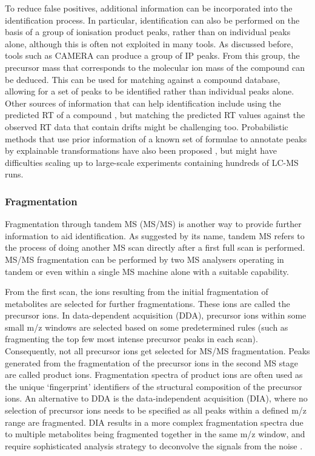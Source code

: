 To reduce false positives, additional information can be incorporated into the identification process. In particular, identification can also be performed on the basis of a group of ionisation product peaks, rather than on individual peaks alone, although this is often not exploited in many tools. As discussed before, tools such as CAMERA \cite{Kuhl2012} can produce a group of IP peaks. From this group, the precursor mass that corresponds to the molecular ion mass of the compound can be deduced. This can be used for matching against a compound database, allowing for a set of peaks to be identified rather than individual peaks alone. Other sources of information that can help identification include using the predicted RT of a compound \cite{Creek2011, Cao2015, Stanstrup2015}, but matching the predicted RT values against the observed RT data that contain drifts might be challenging too. Probabilistic methods that use prior information of a known set of formulae to annotate peaks by explainable transformations have also been proposed \cite{Rogers2009a, Daly2014}, but might have difficulties scaling up to large-scale experiments containing hundreds of LC-MS runs.

\subsubsection{Fragmentation}

Fragmentation through tandem MS (MS/MS) is another way to provide further information to aid identification. As suggested by its name, tandem MS refers to the process of doing another MS scan directly after a first full scan is performed. MS/MS fragmentation can be performed by two MS analysers operating in tandem or even within a single MS machine alone with a suitable capability. 

From the first scan, the ions resulting from the initial fragmentation of metabolites are selected for further fragmentations. These ions are called the precursor ions. In data-dependent acquisition (DDA), precursor ions within some small m/z windows are selected based on some predetermined rules (such as fragmenting the top few most intense precursor peaks in each scan). Consequently, not all precursor ions get selected for MS/MS fragmentation. Peaks generated from the fragmentation of the precursor ions in the second MS stage are called product ions. Fragmentation spectra of product ions are often used as the unique `fingerprint' identifiers of the structural composition of the precursor ions. An alternative to DDA is the data-independent acquisition (DIA), where no selection of precursor ions needs to be specified as all peaks within a defined m/z range are fragmented. DIA results in a more complex fragmentation spectra due to multiple metabolites being fragmented together in the same m/z window, and require sophisticated analysis strategy to deconvolve the signals from the noise \cite{tsugawa2015ms}.

